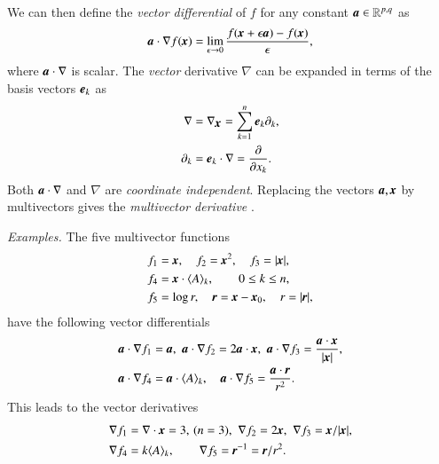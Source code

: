 \documentclass[cameraready]{jcmsi}%
\newcommand{\vect}[1]{\ensuremath{\mbox{\textbf{\textit{#1}}}}}
\begin{document}
We can then define the \textit{vector differential} \cite{HS:CAtoGC,EH:VecDC} of $f$ for any constant $\vect{a} \in \mathbb{R}^{p,q}$ as
\begin{equation}\label{eqma1}
  \vect{a}\cdot\nabla f(\vect{x})=\lim_{\epsilon  \rightarrow 0}
  \frac{f(\vect{x}+\epsilon \vect{a})-f(\vect{x})}{\epsilon } , 
\end{equation}
where $\vect{a}\cdot\nabla$ is scalar.
The \textit{vector} derivative $\nabla$ can be expanded in terms of the basis vectors $\vect{e}_k$ as
\begin{align}  
  \nabla &= \nabla_{\scriptstyle \vect{x}} = \sum_{k=1}^{n} \vect{e}_k {\partial_k },
  \nonumber \\
  {\partial_k } &= \vect{e}_k \cdot\nabla = \frac{\partial}{\partial x_k}.
  \label{eq4}
\end{align}
Both $\vect{a}\cdot\nabla$ and $\nabla$ are \textit{coordinate independent}.
Replacing the vectors $\vect{a},\vect{x}$ by multivectors gives the \textit{multivector derivative} \cite{HS:CAtoGC,EH:MVDC}.

\textit{Examples.}
The five multivector functions 
\begin{align}
  f_1 &= \vect{x}, \quad
  f_2 = \vect{x}^2, \quad
  f_3 = |\vect{x}|,
  \nonumber \\
  f_4 &= \vect{x}\cdot \langle A \rangle_k, \qquad
    0\leq k \leq n,
  \\
  f_5 &= \log r, \quad 
  \vect{r}=\vect{x}-\vect{x}_0, \quad
  r = |\vect{r}|, 
  \nonumber 
\end{align}
have the following vector differentials \cite{EH:VecDC}
\begin{align}
  \vect{a}\cdot\nabla f_1 &= \vect{a}, \,\,
  \vect{a}\cdot\nabla f_2 = 2\vect{a}\cdot \vect{x}, \,\,
  \vect{a}\cdot\nabla f_3 = \frac{\vect{a}\cdot \vect{x}}{|\vect{x}|}, 
  \nonumber \\
  \vect{a}\cdot\nabla f_4 &= \vect{a}\cdot \langle A \rangle_k,\quad 
  \vect{a}\cdot\nabla f_5 = \frac{\vect{a}\cdot \vect{r}}{r^2}. 
\end{align}
This leads to the vector derivatives \cite{EH:VecDC}
\begin{align}
  \nabla f_1 &= \nabla\cdot \vect{x} = 3, \, (n=3), \,\,
  \nabla f_2 = 2 \vect{x}, \,\,
  \nabla f_3 = \vect{x}/|\vect{x}|, 
  \nonumber \\
  \nabla f_4 &= k \langle A \rangle_k, \qquad
  \nabla f_5 = \vect{r}^{-1}= \vect{r}/r^2.
\end{align}
\end{document}
